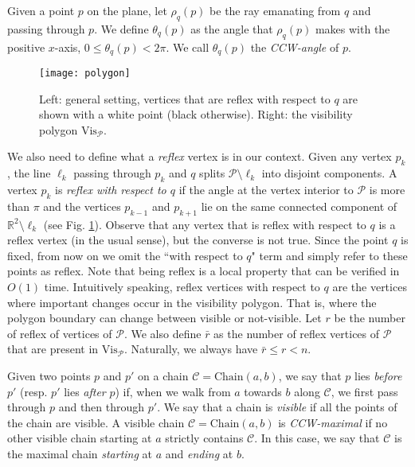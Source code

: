\documentclass[a4paper]{article}
\newcommand{\Poly}{\ensuremath{\mathcal{P}}}               \newcommand{\bd}{\ensuremath{\partial \Poly} }                 \newcommand{\Vis}{\ensuremath{\mathrm{Vis}_\Poly}} \newcommand{\VisC}{\ensuremath{\mathrm{Vis}_{\mathcal{C}}}} \newcommand{\VisCprime}{\ensuremath{\mathrm{Vis}_{\mathcal{C'}}}} \newcommand{\E}{\ensuremath{\mathrm{E}}}                    \newcommand{\Rin}{\ensuremath{r}}      \newcommand{\Rout}{\ensuremath{\bar{r}}}      \newcommand{\Hout}{\ensuremath{\bar{h}}}      \newcommand{\chain}{\ensuremath{{\mathrm{Chain}}}}     \newcommand{\region}{\ensuremath{{{\mathcal R}}}}
\newcommand{\C}{\ensuremath{{\mathcal C}}}
\begin{document}
Given a point $p$ on the plane, let $\rho_q(p)$ be the ray emanating from $q$ and passing through $p$.
We define $\theta_q(p)$ as the angle that $\rho_q(p)$ makes with the positive $x$-axis, $0\leq \theta_q(p) < 2\pi$. 
We call $\theta_q(p)$ the \emph{CCW-angle} of $p$.








\begin{figure}[tb!]
\centering
\texttt{[image: polygon]}
\caption{Left:	general setting, vertices that are reflex with respect to $q$ are shown with a white point (black otherwise). Right: the visibility polygon $\Vis$.
}
\label{fig:polygon}
\end{figure}

We also need to define what a \emph{reflex} vertex is in our context. Given any vertex $p_k$, the line $\ell_k$ passing through $p_k$ and $q$ splits $\Poly \setminus \ell_k$ into disjoint components. A vertex $p_k$ is \emph{reflex with respect to $q$} if the angle at the vertex interior to $\Poly$ is more than $\pi$ and the vertices $p_{k-1}$ and $p_{k+1}$ lie on the same connected component of $\mathbb{R}^2\setminus \ell_k$ (see Fig. \ref{fig:polygon}). 
Observe that any vertex that is reflex with respect to $q$ is a reflex vertex (in the usual sense), but the converse is not true. Since the point $q$ is fixed, from now on we omit the ``with respect to $q$" term and simply refer to these points as reflex. 
Note that being reflex is a local property that can be verified in $O(1)$ time.
Intuitively speaking, reflex vertices with respect to $q$ are the vertices where important changes occur in the visibility polygon. That is, where the polygon boundary can change between visible or not-visible. Let $\Rin$ be the number of reflex of  vertices of $\Poly$. We also define $\Rout$ as the number of reflex vertices of $\Poly$ that are present in $\Vis$. Naturally, we always have $\Rout\leq \Rin < n$.

Given two points $p$ and $p'$ on a chain $\C=\chain(a,b)$, we say that $p$ lies \emph{before} $p'$ (resp. $p'$ lies \emph{after} $p$) if, when we walk from $a$ towards $b$ along $\C$, we first pass through $p$ and then through $p'$. We say that a chain is {\em visible} if all the points of the chain are visible. A visible chain $\C=\chain(a,b)$ is \emph{CCW-maximal} if no other visible chain starting at $a$ strictly contains ${\mathcal C}$. In this case, we say that $\C$ is the maximal chain {\em starting} at $a$ and {\em ending} at $b$.
\end{document}
